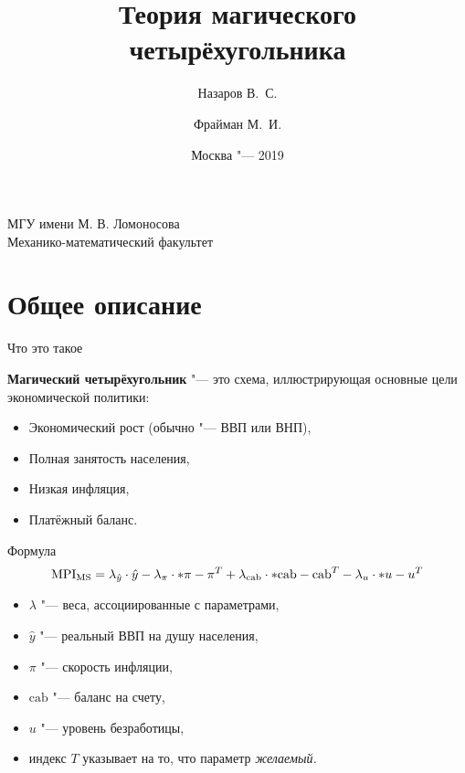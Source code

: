 \documentclass{beamer}
\let\abs\relax
\DeclarePairedDelimiter\abs{\lvert}{\rvert}
\begin{document}
\title{{Теория магического четырёхугольника}}
\author[%
	Назаров В.\ С. \and Фрайман М.\ И.
]{%
	\scriptsize
	Назаров В.\ С. \and Фрайман М.\ И.
}
\date{\footnotesize{Москва "--- 2019}}


	\begin{frame}
		\begin{center}
			\footnotesize{МГУ имени М. В. Ломоносова}\\
			\footnotesize{Механико-математический факультет}\\\vspace{10pt}
		\end{center}
		\titlepage
	\end{frame}

	\section{Общее описание}

	\begin{frame}{Что это такое}
	
		\textbf{Магический четырёхугольник} "--- это схема, иллюстрирующая основные цели экономической политики:
		\begin{itemize}
			\item Экономический рост (обычно "--- ВВП или ВНП),
			\item Полная занятость населения,
			\item Низкая инфляция,
			\item Платёжный баланс.
		\end{itemize}
		
	\end{frame}
	
	\begin{frame}{Формула}
			\[
				\mathrm{MPI_{MS}} = \lambda_{\hat{y}}\cdot\hat{y} - 
									\lambda_\pi\cdot\abs*{\pi-\pi^T} +
									\lambda_{\mathrm{cab}}\cdot\abs*{{\mathrm{cab}}-{\mathrm{cab}}^T} -
									\lambda_u\cdot\abs*{u-u^T}
			\]
			
			\begin{itemize}
			\item $\lambda$ "--- веса, ассоциированные с параметрами,
			\item $\hat{y}$ "--- реальный ВВП на душу населения,
			\item $\pi$ "--- скорость инфляции,
			\item $\mathrm{cab}$ "--- баланс на счету,
			\item $u$ "--- уровень безработицы,
			\item индекс $T$ указывает на то, что параметр \textit{желаемый.}
			\end{itemize}
			
	\end{frame}
\end{document}

